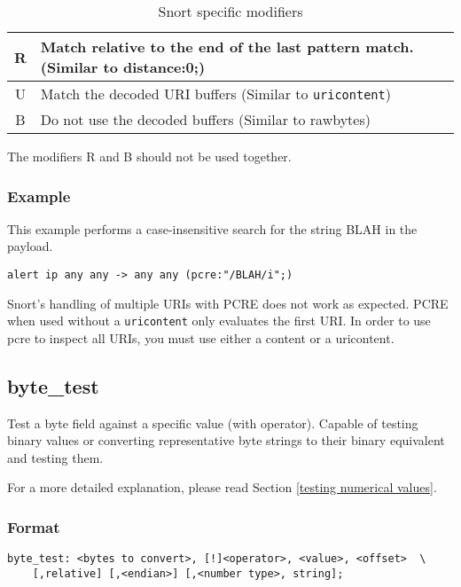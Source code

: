\documentclass[english]{report}
\newenvironment{note}{
\samepage
    \vspace{10pt}{\textsf{
        {\hspace{7pt}\Huge{$\triangle$\hspace{-12.5pt}{\Large{$^!$}}}}\hspace{5pt}
        {\Large{NOTE}}
    }
    }
   \begin{center}
    \par\vspace{-17pt}

    \begin{lrbox}{\savepar}
    \begin{minipage}[r]{6in}
}
{
    \end{minipage}
    \end{lrbox}
    \fbox{
        \usebox{
            \savepar
	}
    }
    \par\vskip10pt
    \end{center}
}
\begin{document}
\begin{longtable}{|c|p{3.5in}|}
\caption{Snort specific modifiers} \\
\hline
R & Match relative to the end of the last pattern match.  (Similar to distance:0;) \\
\hline
U & Match the decoded URI buffers (Similar to \texttt{uricontent}) \\
\hline
B & Do not use the decoded buffers (Similar to rawbytes) \\
\hline
\end{longtable}

The modifiers R and B should not be used together.

\subsubsection{Example}

This example performs a case-insensitive search for the string BLAH in the payload.

\begin{verbatim}
alert ip any any -> any any (pcre:"/BLAH/i";)
\end{verbatim}

\begin{note}
Snort's handling of multiple URIs with PCRE does not work as expected.  PCRE when used without a \texttt{uricontent} only evaluates the first URI.  In order to use pcre to inspect all URIs, you must use either a content or a uricontent.
\end{note}

\subsection{byte\_test\label{sub:byte_test}}

Test a byte field against a specific value (with operator).  Capable
 of testing binary values or converting representative byte strings to
their binary equivalent and testing them.

For a more detailed explanation, please read Section \ref{testing numerical values}.

\subsubsection{Format}

\begin{verbatim}
byte_test: <bytes to convert>, [!]<operator>, <value>, <offset>  \
    [,relative] [,<endian>] [,<number type>, string];
\end{verbatim}
			
\end{document}
